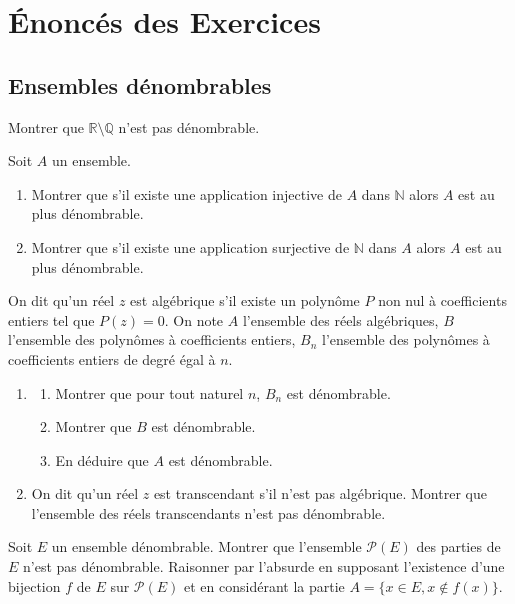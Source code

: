 \section{Énoncés des Exercices}

\subsection{Ensembles dénombrables}

\begin{exercice}
Montrer que $\mathbb{R} \setminus \mathbb{Q}$ n'est pas dénombrable.
\end{exercice}

\begin{exercice}
Soit $A$ un ensemble.
\begin{enumerate}
    \item Montrer que s'il existe une application injective de $A$ dans $\mathbb{N}$ alors $A$ est au plus dénombrable.
    \item Montrer que s'il existe une application surjective de $\mathbb{N}$ dans $A$ alors $A$ est au plus dénombrable.
\end{enumerate}
\end{exercice}

\begin{exercice}
On dit qu'un réel $z$ est algébrique s'il existe un polynôme $P$ non nul à coefficients entiers tel que $P(z)=0$.
On note $A$ l'ensemble des réels algébriques, $B$ l'ensemble des polynômes à coefficients entiers, $B_{n}$ l'ensemble des polynômes à coefficients entiers de degré égal à $n$.
\begin{enumerate}
    \item 
    \begin{enumerate}
        \item Montrer que pour tout naturel $n$, $B_{n}$ est dénombrable.
        \item Montrer que $B$ est dénombrable.
        \item En déduire que $A$ est dénombrable.
    \end{enumerate}
    \item On dit qu'un réel $z$ est transcendant s'il n'est pas algébrique. Montrer que l'ensemble des réels transcendants n'est pas dénombrable.
\end{enumerate}
\end{exercice}

\begin{exercice}
Soit $E$ un ensemble dénombrable. Montrer que l'ensemble $\mathcal{P}(E)$ des parties de $E$ n'est pas dénombrable.
Raisonner par l'absurde en supposant l'existence d'une bijection $f$ de $E$ sur $\mathcal{P}(E)$ et en considérant la partie $A=\{x\in E, x\notin f(x)\}$.
\end{exercice}

